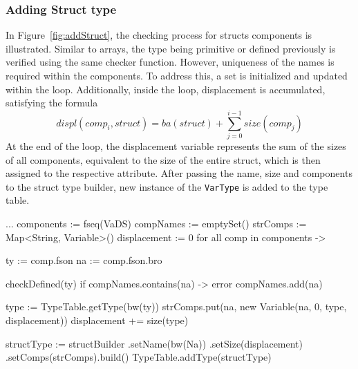 \subsubsection{Adding Struct type}
In Figure~\ref{fig:addStruct}, the checking process for structs components is illustrated.
Similar to arrays, the type being primitive or defined previously is verified using the same checker function.
However, uniqueness of the names is required within the components.
To address this, a set is initialized and updated within the loop.
Additionally, inside the loop, displacement is accumulated, satisfying the formula
\[ displ(comp_i, struct) = ba(struct) + \sum_{j=0}^{i-1}size(comp_j)\]
At the end of the loop, the displacement variable represents the sum of the sizes of all components,
equivalent to the size of the entire struct, which is then assigned to the respective attribute.
After passing the name, size and components to the struct type builder, new instance of the \verb+VarType+
is added to the type table.
\begin{codeblock}
    ...
    components := fseq(VaDS)
    compNames := emptySet()
    strComps := Map<String, Variable>()
    displacement := 0
    for all comp in components -> {
        ty := comp.fson
        na := comp.fson.bro

        checkDefined(ty)
        if compNames.contains(na) -> { error }
        compNames.add(na)

        type := TypeTable.getType(bw(ty))
        strComps.put(na, new Variable(na, 0, type, displacement))
        displacement += size(type)
    }
    structType := structBuilder
        .setName(bw(Na))
        .setSize(displacement)
        .setComps(strComps).build()
    TypeTable.addType(structType)
\end{codeblock}
